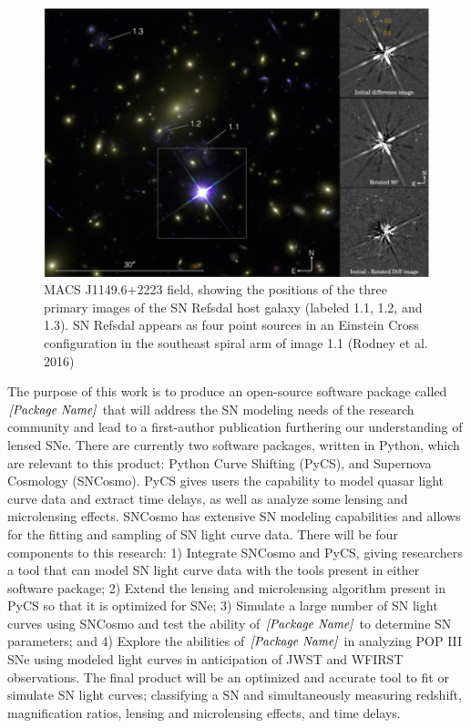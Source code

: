 \begin{figure}[h]
\centering
\includegraphics[scale=.25]{rodney_refs.png}
\caption{MACS J1149.6+2223 field, showing the positions of the three primary images of the SN Refsdal host galaxy (labeled 1.1, 1.2, and 1.3). SN Refsdal appears as four point sources in an Einstein Cross configuration in the southeast spiral arm of image 1.1 (Rodney et al. 2016)}
\end{figure}


The purpose of this work is to produce an open-source software package called $\textit{[Package Name]}$ that will address the SN modeling needs of the research community and lead to a first-author publication furthering our understanding of lensed SNe. There are currently two software packages, written in Python, which are relevant to this product: Python Curve Shifting (PyCS), and Supernova Cosmology (SNCosmo). PyCS gives users the capability to model quasar light curve data and extract time delays, as well as analyze some lensing and microlensing effects. SNCosmo has extensive SN modeling capabilities and allows for the fitting and sampling of SN light curve data. There will be four components to this research: 1) Integrate SNCosmo and PyCS, giving researchers a tool that can model SN light curve data with the tools present in either software package; 2) Extend the lensing and microlensing algorithm present in PyCS so that it is optimized for SNe; 3) Simulate a large number of SN light curves using SNCosmo and test the ability of $\textit{[Package Name]}$ to determine SN parameters; and 4) Explore the abilities of $\textit{[Package Name]}$ in analyzing POP III SNe using modeled light curves in anticipation of JWST and WFIRST observations. The final product will be an optimized and accurate tool to fit or simulate SN light curves; classifying a SN and simultaneously measuring redshift, magnification ratios, lensing and microlensing effects, and time delays.


